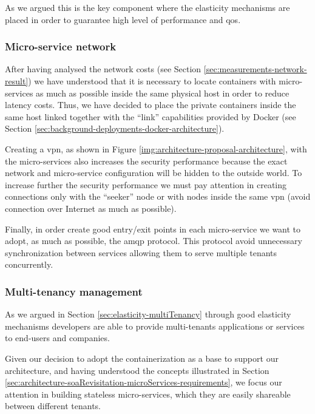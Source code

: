 As we argued this is the key component where the elasticity mechanisms are placed in order to guarantee
high level of performance and \ac{qos}.

\subsubsection{Micro-service network}
\label{sec:architecture-propoasal-architecture-network}
After having analysed the network costs (see Section \ref{sec:measurements-network-result}) we have
understood that it is necessary to locate containers with micro-services as much as possible inside 
the same physical host in order to reduce latency costs. Thus, we have decided to place the private
containers inside the same host linked together with the ``link'' capabilities provided by Docker
(see Section \ref{sec:background-deployments-docker-architecture}).

Creating a \ac{vpn}, as shown in Figure \ref{img:architecture-proposal-architecture}, with the
micro-services also increases the security performance because the exact network and micro-service
configuration will be hidden to the outside world. To increase further the security performance we must
pay attention in creating connections only with the ``seeker'' node  or with nodes inside the same
\ac{vpn} (avoid connection over Internet as much as possible).

Finally, in order create good entry/exit points in each micro-service we want to adopt, as much as possible,
the \ac{amqp} protocol. This protocol avoid unnecessary synchronization between services allowing them
to serve multiple tenants concurrently.

\subsubsection{Multi-tenancy management}
\label{sec:architecture-propoasal-architecture-multiTenancy}
As we argued in Section \ref{sec:elasticity-multiTenancy} through good elasticity mechanisms developers
are able to provide multi-tenants applications or services to end-users and companies.

Given our decision to adopt the containerization as a base to support our architecture, and having 
understood the concepts illustrated in Section \ref{sec:architecture-soaRevisitation-microServices-requirements},
we focus our attention in building stateless micro-services, which they are easily shareable between
different tenants.

